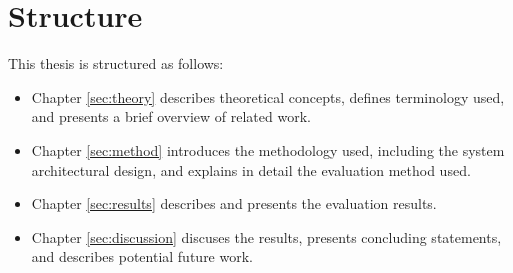 \section{Structure}
This thesis is structured as follows:
\begin{itemize}
  \item Chapter \ref{sec:theory} describes theoretical concepts, defines terminology used, and presents a brief overview of related work.
  \item Chapter \ref{sec:method} introduces the methodology used, including the system architectural design, and explains in detail the evaluation method used.
  \item Chapter \ref{sec:results} describes and presents the evaluation results.
  \item Chapter \ref{sec:discussion} discuses the results, presents concluding statements, and describes potential future work.
\end{itemize}
